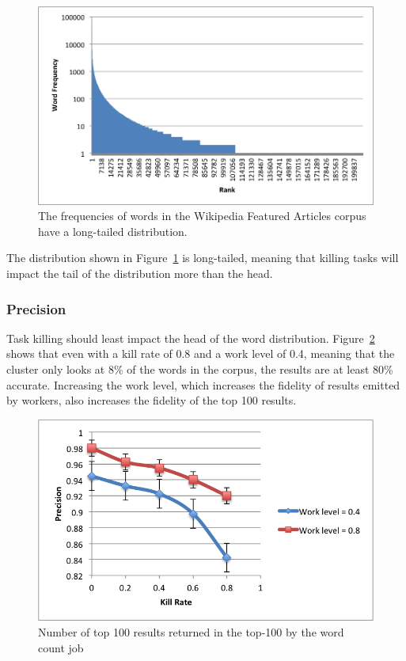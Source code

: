 \documentclass[12pt]{article}
\begin{document}
\begin{figure}
\includegraphics[width=\linewidth]{long-tail-ranks.png}
\caption{The frequencies of words in the Wikipedia Featured Articles corpus\\
have a long-tailed distribution.}
\label{fig:wordDist}
\end{figure}

The distribution shown in Figure~\ref{fig:wordDist} is long-tailed, meaning that killing
tasks will impact the tail of the distribution more than the head.

\subsubsection{Precision}
Task killing should least impact the head of the word distribution.
Figure~\ref{fig:precision} shows that even with a kill rate of 0.8 and a work level of
0.4, meaning that the cluster only looks at 8\% of the words in the corpus, the results
are at least 80\% accurate. Increasing the work level, which increases the fidelity of
results emitted by workers, also increases the fidelity of the top 100 results.


\begin{figure}
\includegraphics[width=\linewidth]{top-100-precision.png}
\caption{Number of top 100 results returned in the top-100 by the word count job}
\label{fig:precision}
\end{figure}
\end{document}
